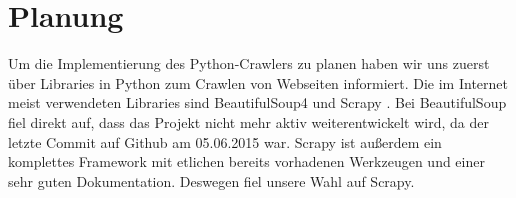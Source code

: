 \chapter{Planung}

Um die Implementierung des Python-Crawlers zu planen haben wir uns zuerst
über Libraries in Python zum Crawlen von Webseiten informiert. Die im
Internet meist verwendeten Libraries sind BeautifulSoup4\cite{beautifulsoup}
und Scrapy\cite{scrapy} . Bei BeautifulSoup fiel direkt auf, dass das Projekt
nicht mehr aktiv weiterentwickelt wird, da der letzte Commit auf Github am
05.06.2015 war. Scrapy ist außerdem ein komplettes Framework mit etlichen
bereits vorhadenen Werkzeugen und einer sehr guten Dokumentation. Deswegen
fiel unsere Wahl auf Scrapy.